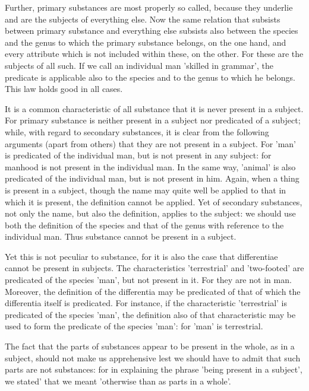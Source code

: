 Further, primary substances are most properly so called, because they
underlie and are the subjects of everything else. Now the same relation
that subsists between primary substance and everything else subsists
also between the species and the genus to which the primary substance
belongs, on the one hand, and every attribute which is not included
within these, on the other. For these are the subjects of all such. If
we call an individual man 'skilled in grammar', the predicate is
applicable also to the species and to the genus to which he belongs.
This law holds good in all cases.

It is a common characteristic of all substance that it is never present
in a subject. For primary substance is neither present in a subject nor
predicated of a subject; while, with regard to secondary substances, it
is clear from the following arguments (apart from others) that they are
not present in a subject. For 'man' is predicated of the individual
man, but is not present in any subject: for manhood is not present in
the individual man. In the same way, 'animal' is also predicated of the
individual man, but is not present in him. Again, when a thing is
present in a subject, though the name may quite well be applied to that
in which it is present, the definition cannot be applied. Yet of
secondary substances, not only the name, but also the definition,
applies to the subject: we should use both the definition of the
species and that of the genus with reference to the individual man.
Thus substance cannot be present in a subject.

Yet this is not peculiar to substance, for it is also the case that
differentiae cannot be present in subjects. The characteristics
'terrestrial' and 'two-footed' are predicated of the species 'man', but
not present in it. For they are not in man. Moreover, the definition of
the differentia may be predicated of that of which the differentia
itself is predicated. For instance, if the characteristic 'terrestrial'
is predicated of the species 'man', the definition also of that
characteristic may be used to form the predicate of the species 'man':
for 'man' is terrestrial.

The fact that the parts of substances appear to be present in the
whole, as in a subject, should not make us apprehensive lest we should
have to admit that such parts are not substances: for in explaining the
phrase 'being present in a subject', we stated' that we meant
'otherwise than as parts in a whole'.

